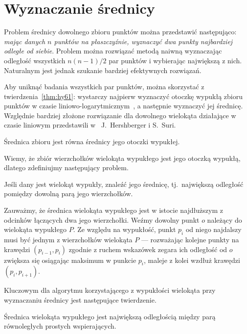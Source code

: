 \chapter{Wyznaczanie średnicy\label{chap:diameter}}
Problem średnicy dowolnego zbioru punktów można przedstawić
następująco: \emph{mając danych $n$ punktów na płaszczyźnie, wyznaczyć
  dwa punkty najbardziej odległe od siebie}. Problem można rozwiązać
metodą naiwną wyznaczając odległość wszystkich $n(n-1)/2$ par punktów
i wybierając największą z nich. Naturalnym jest jednak szukanie
bardziej efektywnych rozwiązań.

Aby uniknąć badania wszystkich par punktów, można skorzystać z
twierdzenia~\ref{thm:hy61}: wystarczy najpierw wyznaczyć otoczkę
wypukłą zbioru punktów w czasie
liniowo-logarytmicznym~\cite{Graham72}, a następnie wyznaczyć jej
średnicę. Względnie bardziej złożone rozwiązanie dla dowolnego
wielokąta działające w czasie liniowym przedstawili w~\cite{Hersh93}
J.\ Hershberger i S.\ Suri.

\begin{twierdzenie}
  Średnica zbioru jest równa średnicy jego otoczki wypukłej.
\end{twierdzenie}

Wiemy, że zbiór wierzchołków wielokąta wypukłego jest jego otoczką
wypukłą, dlatego zdefiniujmy następujący problem.

\begin{problem}
  Jeśli dany jest wielokąt wypukły, znaleźć jego średnicę,
  tj.\ największą odległość pomiędzy dowolną parą jego wierzchołków.
\end{problem}

Zauważmy, że średnica wielokąta wypukłego jest w istocie najdłuższym z
odcinków łączących dwa jego wierzchołki. Weźmy dowolny punkt $o$
należący do wielokąta wypukłego $P$. Ze względu na wypukłość, punkt
$p_i$ od niego najdalszy musi być jednym z wierzchołków wielokąta $P$
--- rozważając kolejne punkty na krawędzi $(p_{i-1}, p_i)$ zgodnie z
ruchem wskazówek zegara ich odległość od $o$ zwiększa się osiągając
maksimum w punkcie $p_i$, maleje z kolei wzdłuż krawędzi $(p_i,
p_{i+1})$.

Kluczowym dla algorytmu korzystającego z wypukłości wielokąta przy
wyznaczaniu średnicy jest następujące twierdzenie.

\begin{twierdzenie}
\label{thm:yagbol}
  Średnica wielokąta wypukłego jest największą odległością między parą
  równoległych prostych wspierających.
\end{twierdzenie}

